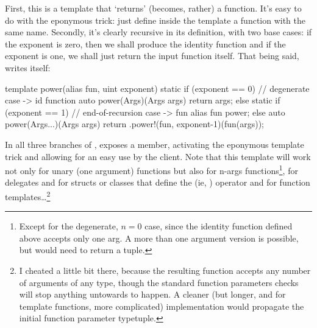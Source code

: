 First, this is a template that `returns' (becomes, rather) a function. It's easy to do with the eponymous trick: just define inside the template a function with the same name. Secondly, it's clearly recursive in its definition, with two base cases: if the exponent is zero, then we shall produce the identity function and if the exponent is one, we shall just return the input function itself. That being said,  writes itself:

\begin{ndcode}
template power(alias fun, uint exponent)
{
    static if (exponent == 0) // degenerate case -> id function
        auto power(Args)(Args args) { return args; }
    else static if (exponent == 1) // end-of-recursion case -> fun
        alias fun power;
    else
        auto power(Args...)(Args args) 
        {
            return .power!(fun, exponent-1)(fun(args));
        }
}
\end{ndcode}


In all three branches of ,  exposes a  member, activating the eponymous template trick and allowing for an easy use by the client. Note that this template will work not only for unary (one argument) functions but also for n-args functions\footnote{ Except for the degenerate, $n = 0$ case, since the identity function defined above accepts only one arg. A more than one argument version is possible, but would need to return a tuple.}, for delegates and for structs or classes that define the \DD{()}(ie, ) operator and for function templates\ldots\footnote{ I cheated a little bit there, because the resulting function accepts any number of arguments of any type, though the standard function parameters checks will stop anything untowards to happen. A cleaner (but longer, and for template functions, more complicated) implementation would propagate the initial function parameter typetuple.}

